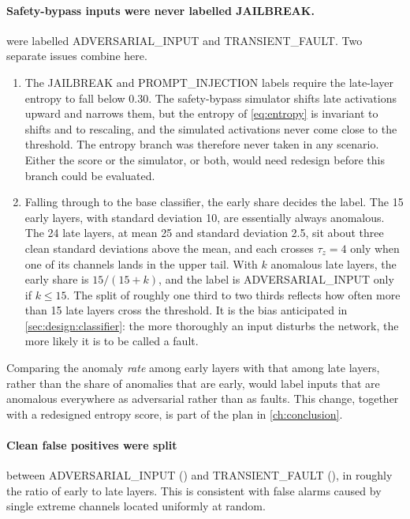 \paragraph{Safety-bypass inputs were never labelled JAILBREAK.} \SafetyAdvFrac{} were labelled
ADVERSARIAL\_INPUT and \SafetyTFFrac{} TRANSIENT\_FAULT. Two separate issues combine here.
\begin{enumerate}[leftmargin=*]
  \item The JAILBREAK and PROMPT\_INJECTION labels require the late-layer entropy to fall below
        0.30. The safety-bypass simulator shifts late activations upward and narrows them, but
        the entropy of \cref{eq:entropy} is invariant to shifts and to rescaling, and the
        simulated activations never come close to the threshold. The entropy branch was
        therefore never taken in any scenario. Either the score or the simulator, or both, would
        need redesign before this branch could be evaluated.
  \item Falling through to the base classifier, the early share decides the label. The 15 early
        layers, with standard deviation 10, are essentially always anomalous. The 24 late layers,
        at mean 25 and standard deviation 2.5, sit about three clean standard deviations above
        the mean, and each crosses $\tau_z=4$ only when one of its channels lands in the upper
        tail. With $k$ anomalous late layers, the early share is $15/(15+k)$, and the label is
        ADVERSARIAL\_INPUT only if $k\le15$. The split of roughly one third to two thirds
        reflects how often more than 15 late layers cross the threshold. It is the bias
        anticipated in \cref{sec:design:classifier}: the more thoroughly an input disturbs the
        network, the more likely it is to be called a fault.
\end{enumerate}
Comparing the anomaly \emph{rate} among early layers with that among late layers, rather than the
share of anomalies that are early, would label inputs that are anomalous everywhere as
adversarial rather than as faults. This change, together with a redesigned entropy score, is part
of the plan in \cref{ch:conclusion}.

\paragraph{Clean false positives were split} between ADVERSARIAL\_INPUT (\CleanAdvFrac{}) and
TRANSIENT\_FAULT (\CleanTFFrac{}), in roughly the ratio of early to late layers. This is
consistent with false alarms caused by single extreme channels located uniformly at random.

